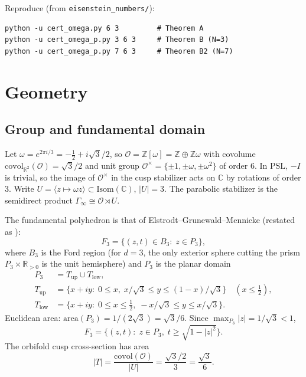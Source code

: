\documentclass[11pt]{amsart}
\newcommand{\ZZ}{\mathbb{Z}}
\newcommand{\RR}{\mathbb{R}}
\newcommand{\CC}{\mathbb{C}}
\newcommand{\PSL}{\mathrm{PSL}}
\begin{document}
Reproduce (from \texttt{eisenstein\_numbers/}):
\begin{verbatim}
python -u cert_omega.py 6 3         # Theorem A
python -u cert_omega_p.py 3 6 3     # Theorem B (N=3)
python -u cert_omega_p.py 7 6 3     # Theorem B2 (N=7)
\end{verbatim}

\section{Geometry}\label{sec:geom}

\subsection{Group and fundamental domain}

Let $\omega=e^{2\pi i/3}=-\tfrac12+i\sqrt{3}/2$, so
$\mathcal{O}=\ZZ[\omega]=\ZZ\oplus\ZZ\omega$ with covolume
$\mathrm{covol}_{\RR^2}(\mathcal{O})=\sqrt{3}/2$ and unit group
$\mathcal{O}^\times=\{\pm 1,\pm\omega,\pm\omega^2\}$ of order $6$.  In
$\PSL$, $-I$ is trivial, so the image of $\mathcal{O}^\times$ in the cusp
stabilizer acts on $\CC$ by rotations of order $3$.  Write
$U=\langle z\mapsto\omega z\rangle\subset\mathrm{Isom}(\CC)$, $|U|=3$.
The parabolic stabilizer is the semidirect product
$\Gamma_\infty\cong\mathcal{O}\rtimes U$.

The fundamental polyhedron is that of Elstrodt--Grunewald--Mennicke
\cite[§7.2--7.3]{EGM98} (restated as \cite[Thm.~2.3]{DP20}):
\[
  F_3=\bigl\{(z,t)\in B_3:\;z\in P_3\bigr\},
\]
where $B_3$ is the Ford region (for $d=3$, the only exterior sphere cutting
the prism $P_3\times\RR_{>0}$ is the unit hemisphere) and $P_3$ is the
planar domain
\begin{align*}
  P_3&=T_{\mathrm{up}}\cup T_{\mathrm{low}},\\
  T_{\mathrm{up}}
  &=\bigl\{x+iy:\;0\le x,\; x/\sqrt{3}\le y\le(1-x)/\sqrt{3}\bigr\}
  \quad(x\le\tfrac12),\\
  T_{\mathrm{low}}
  &=\bigl\{x+iy:\;0\le x\le\tfrac12,\; -x/\sqrt{3}\le y\le x/\sqrt{3}\bigr\}.
\end{align*}
Euclidean area: $\mathrm{area}(P_3)=1/(2\sqrt{3})=\sqrt{3}/6$.  Since
$\max_{P_3}|z|=1/\sqrt{3}<1$,
\[
  F_3=\bigl\{(z,t):\;z\in P_3,\; t\ge\sqrt{1-|z|^2}\bigr\}.
\]
The orbifold cusp cross-section has area
\[
  |T|=\frac{\mathrm{covol}(\mathcal{O})}{|U|}=\frac{\sqrt{3}/2}{3}=\frac{\sqrt{3}}{6}.
\]
\end{document}
